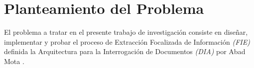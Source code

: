 \chapter{Planteamiento del Problema} \label{chap:planteamientoProblema}

El problema a tratar en el presente trabajo de investigación consiste en diseñar, implementar y probar el proceso de Extracción Focalizada de Información \emph{(FIE)} definida la Arquitectura para la Interrogación de Documentos \emph{(DIA)} por Abad Mota \cite{documentInterrogationArchitecture}. 
